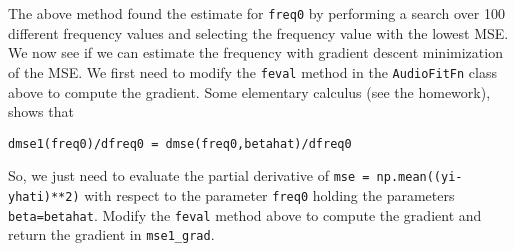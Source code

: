 \documentclass[11pt]{article}
\begin{document}
The above method found the estimate for \texttt{freq0} by performing a
search over 100 different frequency values and selecting the frequency
value with the lowest MSE. We now see if we can estimate the frequency
with gradient descent minimization of the MSE. We first need to modify
the \texttt{feval} method in the \texttt{AudioFitFn} class above to
compute the gradient. Some elementary calculus (see the homework), shows
that

\begin{verbatim}
dmse1(freq0)/dfreq0 = dmse(freq0,betahat)/dfreq0
\end{verbatim}

So, we just need to evaluate the partial derivative of
\texttt{mse\ =\ np.mean((yi-yhati)**2)} with respect to the parameter
\texttt{freq0} holding the parameters \texttt{beta=betahat}. Modify the
\texttt{feval} method above to compute the gradient and return the
gradient in \texttt{mse1\_grad}.
\end{document}
